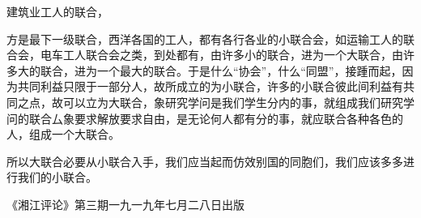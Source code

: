 建筑业工人的联合，

方是最下一级联合，西洋各国的工人，都有各行各业的小联合会，如运输工人的联合会，电车工人联合会之类，到处都有，由许多小的联合，进为一个大联合，由许多大的联合，进为一个最大的联合。于是什么“协会”，什么“同盟”，接踵而起，因为共同利益只限于一部分人，故所成立的为小联合，许多的小联合彼此间利益有共同之点，故可以立为大联合，象研究学问是我们学生分内的事，就组成我们研究学问的联合厶象要求解放要求自由，是无论何人都有分的事，就应联合各种各色的人，组成一个大联合。

所以大联合必要从小联合入手，我们应当起而仿效别国的同胞们，我们应该多多进行我们的小联合。

\begin{flushright}《湘江评论》第三期一九一九年七月二八日出版\end{flushright}

